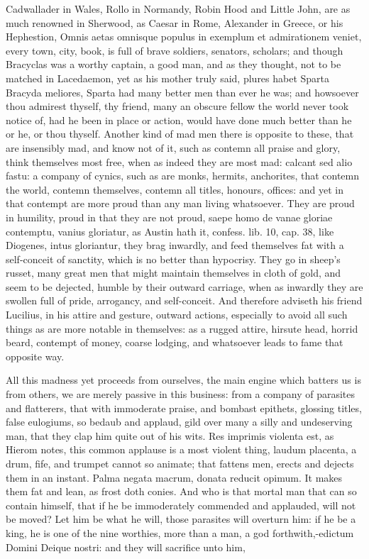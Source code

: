 {Cadwallader in Wales, Rollo in Normandy, Robin Hood and Little John,
are as much renowned in Sherwood, as Caesar in Rome, Alexander in
Greece, or his Hephestion,  Omnis aetas omnisque populus in
exemplum et admirationem veniet, every town, city, book, is full of
brave soldiers, senators, scholars; and though Bracyclas was a
worthy captain, a good man, and as they thought, not to be matched in
Lacedaemon, yet as his mother truly said, plures habet Sparta Bracyda
meliores, Sparta had many better men than ever he was; and howsoever
thou admirest thyself, thy friend, many an obscure fellow the world
never took notice of, had he been in place or action, would have done
much better than he or he, or thou thyself.
Another kind of mad men there is opposite to these, that are insensibly
mad, and know not of it, such as contemn all praise and glory, think
themselves most free, when as indeed they are most mad: calcant sed
alio fastu: a company of cynics, such as are monks, hermits,
anchorites, that contemn the world, contemn themselves, contemn all
titles, honours, offices: and yet in that contempt are more proud than
any man living whatsoever. They are proud in humility, proud in that
they are not proud, saepe homo de vanae gloriae contemptu, vanius
gloriatur, as Austin hath it, confess. lib. 10, cap. 38, like Diogenes,
intus gloriantur, they brag inwardly, and feed themselves fat with a
self-conceit of sanctity, which is no better than hypocrisy. They go in
sheep's russet, many great men that might maintain themselves in cloth
of gold, and seem to be dejected, humble by their outward carriage,
when as inwardly they are swollen full of pride, arrogancy, and
self-conceit. And therefore \Seneca adviseth his friend Lucilius,
in his attire and gesture, outward actions, especially to avoid
all such things as are more notable in themselves: as a rugged attire,
hirsute head, horrid beard, contempt of money, coarse lodging, and
whatsoever leads to fame that opposite way.

All this madness yet proceeds from ourselves, the main engine which
batters us is from others, we are merely passive in this business: from
a company of parasites and flatterers, that with immoderate praise, and
bombast epithets, glossing titles, false eulogiums, so bedaub and
applaud, gild over many a silly and undeserving man, that they clap him
quite out of his wits. Res imprimis violenta est, as Hierom notes, this
common applause is a most violent thing, laudum placenta, a drum, fife,
and trumpet cannot so animate; that fattens men, erects and dejects
them in an instant.  Palma negata macrum, donata reducit opimum.
It makes them fat and lean, as frost doth conies. And who is that
mortal man that can so contain himself, that if he be immoderately
commended and applauded, will not be moved? Let him be what he will,
those parasites will overturn him: if he be a king, he is one of the
nine worthies, more than a man, a god forthwith,-edictum Domini
Deique nostri: and they will sacrifice unto him,

}
